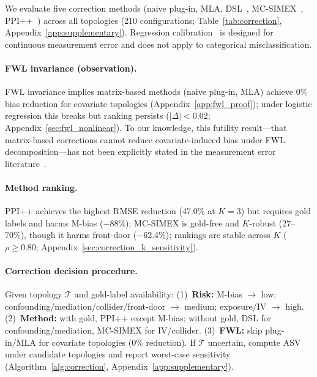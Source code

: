 We evaluate five correction methods (naive plug-in, MLA, DSL~\cite{egami_hinck_stewart_wei2023}, MC-SIMEX~\cite{kuchenhoff2006simex}, PPI++~\cite{angelopoulos2023}) across all topologies (210 configurations; Table~\ref{tab:correction}, Appendix~\ref{app:supplementary}). Regression calibration~\cite{carroll2006} is designed for continuous measurement error and does not apply to categorical misclassification.

\paragraph{FWL invariance (observation).}
FWL invariance implies matrix-based methods (naive plug-in, MLA) achieve 0\% bias reduction for covariate topologies (Appendix~\ref{app:fwl_proof}); under logistic regression this breaks but ranking persists ($|\Delta| < 0.02$; Appendix~\ref{sec:fwl_nonlinear}). To our knowledge, this futility result---that matrix-based corrections cannot reduce covariate-induced bias under FWL decomposition---has not been explicitly stated in the measurement error literature~\cite{carroll2006, buonaccorsi2010}.

\paragraph{Method ranking.}
PPI++ achieves the highest RMSE reduction (47.0\% at $K{=}3$) but requires gold labels and harms M-bias ($-$88\%); MC-SIMEX is gold-free and $K$-robust (27--70\%), though it harms front-door ($-$62.4\%); rankings are stable across $K$ ($\rho \geq 0.80$; Appendix~\ref{sec:correction_k_sensitivity}).

\paragraph{Correction decision procedure.}
Given topology $\mathcal{T}$ and gold-label availability: (1)~\textbf{Risk:} M-bias $\to$ low; confounding/mediation/collider/front-door $\to$ medium; exposure/IV $\to$ high. (2)~\textbf{Method:} with gold, PPI++ except M-bias; without gold, DSL for confounding/mediation, MC-SIMEX for IV/collider. (3)~\textbf{FWL:} skip plug-in/MLA for covariate topologies (0\% reduction). If $\mathcal{T}$ uncertain, compute ASV under candidate topologies and report worst-case sensitivity (Algorithm~\ref{alg:correction}, Appendix~\ref{app:supplementary}).

